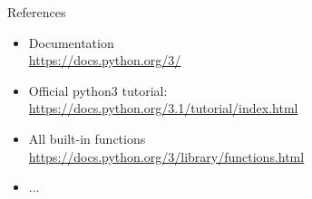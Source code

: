 \documentclass[10pt]{beamer}
\begin{document}
\begin{frame}[fragile]{References}

    \begin{itemize}
        \item Documentation\\
            \url{https://docs.python.org/3/}
        \item \pause Official python3 tutorial:\\
            \url{https://docs.python.org/3.1/tutorial/index.html}
        \item \pause All built-in functions\\
        	\url{https://docs.python.org/3/library/functions.html}
        \item \pause ...

    \end{itemize}

\end{frame}
\end{document}
